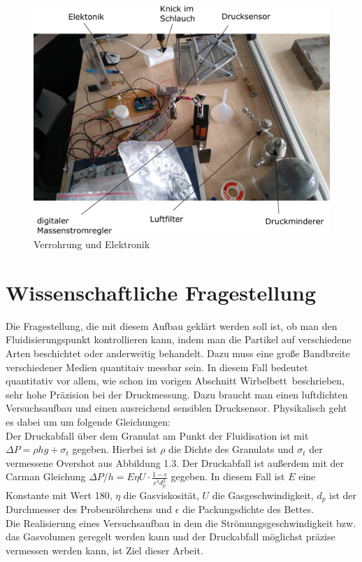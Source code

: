 \begin{figure}[h]
	\begin{center}
		\includegraphics[scale=0.6]{Kabel_Rohrleitungen_alt.png}
		\caption{Verrohrung und Elektronik}
	\end{center}
\end{figure}


\section{Wissenschaftliche Fragestellung}

Die Fragestellung, die mit diesem Aufbau geklärt werden soll ist, ob man den Fluidisierungspunkt kontrollieren kann, indem man die Partikel auf verschiedene Arten beschichtet oder anderweitig behandelt. Dazu muss eine große Bandbreite verschiedener Medien quantitaiv messbar sein. In diesem Fall bedeutet quantitativ vor allem, wie schon im vorigen Abschnitt \glqq Wirbelbett\grqq \ beschrieben, sehr hohe Präzision bei der Druckmessung. Dazu braucht man einen luftdichten Versuchsaufbau und einen ausreichend sensiblen Drucksensor. Physikalisch geht es dabei um um folgende Gleichungen: \\
Der Druckabfall über dem Granulat am Punkt der Fluidisation ist mit $\Delta P = \rho h g + \sigma_t$ gegeben. Hierbei ist $\rho$ die Dichte des Granulats und $\sigma_t$ der vermessene Overshot aus Abbildung 1.3. Der Druckabfall ist außerdem mit der Carman Gleichung $\Delta P / h = E \eta U \cdot \frac{1 - \epsilon}{\epsilon^3 d_p^2}$ gegeben. In diesem Fall ist $E$ eine Konstante mit Wert 180, $\eta$ die Gasviskosität, $U$ die Gasgeschwindigkeit, $d_p$ ist der Durchmesser des Probenröhrchens und $\epsilon$ die Packungsdichte des Bettes. \\
Die Realisierung eines Versuchsaufbau in dem die Strömungsgeschwindigkeit bzw. das Gasvolumen geregelt werden kann und der Druckabfall möglichst präzise vermessen werden kann, ist Ziel dieser Arbeit.


